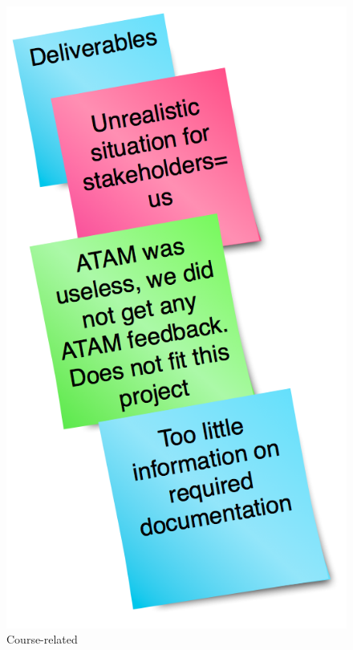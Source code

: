 \documentclass[titlepage,a4paper,11pt]{article}
\begin{document}
\begin{figure}[H]
\begin{minipage}[b]{0.5\linewidth}
        \centering
        \includegraphics[scale=0.4]{graphics/postit/NEG_deliverables}
        \caption{Course-related}
        \label{fig:neg2}
    \end{minipage}
\end{figure}
\end{document}

